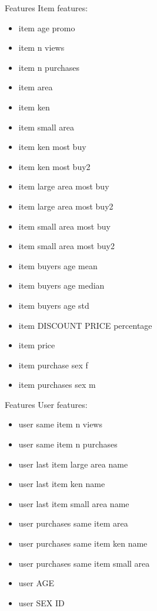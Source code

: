 \documentclass{beamer}
\begin{document}
\begin{frame}{Features}
	Item features:
	
\begin{itemize}
	\tiny
	\item item age promo
	\item item n views
	\item item n purchases
	\item item area
	\item item ken
	\item item small area
	\item item ken most buy
	\item item ken most buy2
	\item item large area most buy
	\item item large area most buy2
	\item item small area most buy
	\item item small area most buy2
	\item item buyers age mean
	\item item buyers age median
	\item item buyers age std
	\item item DISCOUNT PRICE percentage
	\item item price
	\item item purchase sex f
	\item item purchases sex m
\end{itemize}
\end{frame}

\begin{frame}{Features}
	User features:
	\begin{itemize}
			\tiny
		\item user same item n views
		\item user same item n purchases
		\item user last item large area name
		\item user last item ken name
		\item user last item small area name
		\item user purchases same item area
		\item user purchases same item ken name
		\item user purchases same item small area
		\item user AGE
		\item user SEX ID
	\end{itemize}
\end{frame}
\end{document}
